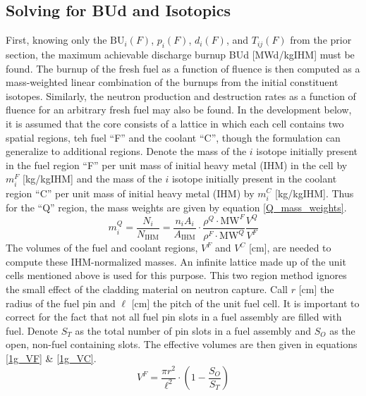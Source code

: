 \subsection{Solving for BUd and Isotopics}
\label{1g_sec:solve_BUd_iso}
First, knowing only the $\mbox{BU}_i(F)$, $p_i(F)$, $d_i(F)$, and $T_{ij}(F)$ from the prior section, 
the maximum achievable discharge burnup BUd [MWd/kgIHM] must be found.  The burnup of the fresh 
fuel as a function of fluence is then computed as a mass-weighted linear combination of the burnups 
from the initial constituent isotopes.  Similarly, the neutron production and destruction rates as a 
function of fluence for an arbitrary fresh fuel may also be found.  In the development below, it is 
assumed that the core consists of a lattice in which each cell contains two spatial regions, teh fuel ``F'' 
and the coolant ``C'', though the formulation can generalize to additional regions.  Denote the mass of the 
$i$ isotope initially present in the fuel region ``F'' per unit mass of initial heavy 
metal (IHM) in the cell by $m_i^F$ [kg/kgIHM] and the mass of the $i$ 
isotope initially present in the coolant region ``C'' per unit mass of initial heavy metal (IHM) by 
$m_i^C$ [kg/kgIHM].  Thus for the ``Q'' region, the mass weights are given 
by equation \ref{Q_mass_weights}.
\begin{equation}
\label{Q_mass_weights}
m_i^Q = \frac{N_i}{N_{\mbox{IHM}}} = \frac{n_i A_i}{A_{\mbox{IHM}}} \cdot \frac{\rho^Q\cdot\mbox{MW}^F}{\rho^F\cdot\mbox{MW}^Q} \frac{V^Q}{V^F}
\end{equation}
The volumes of the fuel and coolant regions, $V^F$ and $V^C$ [cm], are needed to 
compute these IHM-normalized masses.  An infinite lattice made up of the unit cells mentioned 
above is used for this purpose.  This two region method ignores the small 
effect of the cladding material on neutron capture.  Call $r$ [cm] the radius of the fuel pin and $\ell$ [cm] 
the pitch of the unit fuel cell.  It is important to correct for the fact that not all fuel 
pin slots in a fuel assembly are filled with fuel.  Denote $S_T$ as the total number of pin 
slots in a fuel assembly and $S_O$ as the open, non-fuel containing slots.  The effective volumes 
are then given in equations \ref{1g_VF} \& \ref{1g_VC}.
\begin{equation}
\label{1g_VF}
V^F = \frac{\pi r^2}{\ell^2} \cdot \left(1 - \frac{S_O}{S_T}\right)
\end{equation}
